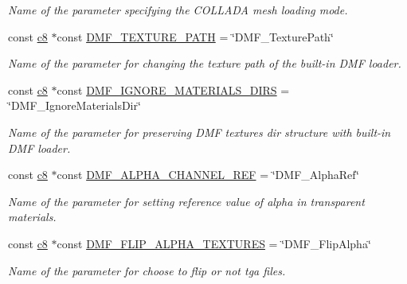 \begin{DoxyCompactItemize}
\begin{DoxyCompactList}\small\item\em Name of the parameter specifying the C\+O\+L\+L\+A\+DA mesh loading mode. \end{DoxyCompactList}\item 
const \hyperlink{namespaceirr_a9395eaea339bcb546b319e9c96bf7410}{c8} $\ast$const \hyperlink{namespaceirr_1_1scene_a2a6e8bd33eaec1815e3e16a59c269fb5}{D\+M\+F\+\_\+\+T\+E\+X\+T\+U\+R\+E\+\_\+\+P\+A\+TH} = \char`\"{}D\+M\+F\+\_\+\+Texture\+Path\char`\"{}
\begin{DoxyCompactList}\small\item\em Name of the parameter for changing the texture path of the built-\/in D\+MF loader. \end{DoxyCompactList}\item 
const \hyperlink{namespaceirr_a9395eaea339bcb546b319e9c96bf7410}{c8} $\ast$const \hyperlink{namespaceirr_1_1scene_ae996d826263cf504dd0260d0a096b0d0}{D\+M\+F\+\_\+\+I\+G\+N\+O\+R\+E\+\_\+\+M\+A\+T\+E\+R\+I\+A\+L\+S\+\_\+\+D\+I\+RS} = \char`\"{}D\+M\+F\+\_\+\+Ignore\+Materials\+Dir\char`\"{}
\begin{DoxyCompactList}\small\item\em Name of the parameter for preserving D\+MF textures dir structure with built-\/in D\+MF loader. \end{DoxyCompactList}\item 
const \hyperlink{namespaceirr_a9395eaea339bcb546b319e9c96bf7410}{c8} $\ast$const \hyperlink{namespaceirr_1_1scene_afd6e025453e80983de80371dc56718ef}{D\+M\+F\+\_\+\+A\+L\+P\+H\+A\+\_\+\+C\+H\+A\+N\+N\+E\+L\+\_\+\+R\+EF} = \char`\"{}D\+M\+F\+\_\+\+Alpha\+Ref\char`\"{}
\begin{DoxyCompactList}\small\item\em Name of the parameter for setting reference value of alpha in transparent materials. \end{DoxyCompactList}\item 
const \hyperlink{namespaceirr_a9395eaea339bcb546b319e9c96bf7410}{c8} $\ast$const \hyperlink{namespaceirr_1_1scene_acdc1ddd0bfeb4118a5d8f3ea953717f6}{D\+M\+F\+\_\+\+F\+L\+I\+P\+\_\+\+A\+L\+P\+H\+A\+\_\+\+T\+E\+X\+T\+U\+R\+ES} = \char`\"{}D\+M\+F\+\_\+\+Flip\+Alpha\char`\"{}
\begin{DoxyCompactList}\small\item\em Name of the parameter for choose to flip or not tga files. \end{DoxyCompactList}\item 

\end{DoxyCompactItemize}
